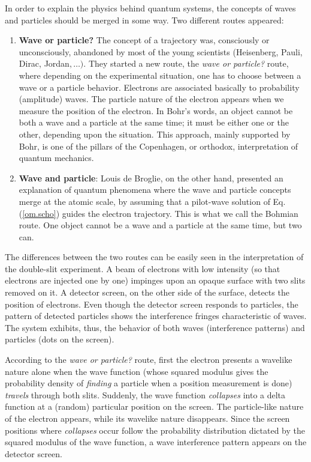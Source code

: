 \documentclass[nofootinbib, secnumarabic, amsmath, nobibnotes,10pt,aps,pra]{revtex4-1}
\newcommand{\eref}[1]{Eq. (\ref{#1})}
\begin{document}
In order to  explain the
physics behind quantum systems, the concepts of waves and particles
should be merged in some way. Two different routes appeared:
\begin{enumerate}
\item \textbf{Wave or particle?} The concept of a trajectory was, consciously or unconsciously, abandoned by most of the young scientists (Heisenberg, Pauli, Dirac, Jordan$,\ldots).$ They started a new route, the \textit{wave or particle?} route, where depending on the experimental situation, one has to choose between a wave or a particle behavior. Electrons are associated basically to probability (amplitude) waves. The particle nature of the electron appears when we measure the position of the electron. In Bohr's words, an object cannot be both a wave and a particle at the same time; it must be either one or the other, depending upon the situation. This approach, mainly supported by Bohr, is one of the pillars of the Copenhagen, or orthodox, interpretation of quantum mechanics.

\item \textbf{Wave and particle}: Louis de Broglie, on the other hand, presented an explanation of quantum phenomena where the wave and particle concepts merge at the atomic scale, by assuming that a pilot-wave solution of \eref{om.scho} guides the electron trajectory. This is what we call the Bohmian route. One object cannot be a wave and a particle at the same time, but two can.
\end{enumerate}

The differences between the two routes can be easily seen in the
interpretation of the double-slit experiment. A beam of electrons
with low intensity (so that electrons are injected one by one)
impinges upon an opaque surface with two slits removed on it. A
detector screen, on the other side of the surface, detects the
position of electrons. Even though the detector screen responds to
particles, the pattern of detected particles shows the interference
fringes characteristic of waves. The system exhibits, thus, the
behavior of both waves (interference patterns) and particles (dots
on the screen).

According to the \textit{wave or particle?} route, first the electron presents a wavelike nature alone when the wave function (whose squared modulus gives the probability density of \textit{finding} a particle when a position measurement is done) \textit{travels} through both slits. Suddenly, the wave function \textit{collapses} into a delta function at a (random) particular position on the screen. The particle-like nature of the electron appears, while its wavelike nature disappears. Since the screen positions where \textit{collapses} occur follow the probability distribution dictated by the squared modulus of the wave function, a wave interference pattern appears on the detector screen.
\end{document}
